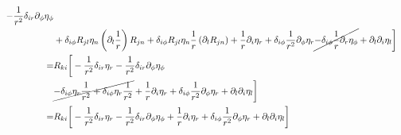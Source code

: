 \documentclass[aps,prl,preprint]{revtex4-2}
\begin{document}
\begin{align}
    -\frac{1}{r^2}\delta_{ir}\partial_\phi\eta_\phi\nonumber                                                                                                                    \\
                                                                 & +\delta_{i\phi}R_{jl}\eta_n\left(\partial_l\frac{1}{r}\right)R_{jn}
    +\delta_{i\phi}R_{jl}\eta_n\frac{1}{r}\left(\partial_lR_{jn}\right) + \frac{1}{r}\partial_i\eta_r
    +\delta_{i\phi}\frac{1}{r^2}\partial_\phi\eta_r\cancel{-\delta_{i\phi}\frac{1}{r}\partial_r\eta_\phi}
    + \partial_l\partial_i\eta_l\bigg]\nonumber                                                                                                                                 \\
    =                                                            & R_{ki}\bigg[-\frac{1}{r^2}\delta_{ir}\eta_r
    -\frac{1}{r^2}\delta_{ir}\partial_\phi\eta_\phi\nonumber                                                                                                                    \\
                                                                 & \cancel{-\delta_{i\phi}\eta_r\frac{1}{r^2} +\delta_{i\phi}\eta_r\frac{1}{r^2}} + \frac{1}{r}\partial_i\eta_r
        +\delta_{i\phi}\frac{1}{r^2}\partial_\phi\eta_r
    + \partial_l\partial_i\eta_l\bigg]\nonumber                                                                                                                                 \\
    =                                                            & R_{ki}\bigg[-\frac{1}{r^2}\delta_{ir}\eta_r
        -\frac{1}{r^2}\delta_{ir}\partial_\phi\eta_\phi + \frac{1}{r}\partial_i\eta_r
        +\delta_{i\phi}\frac{1}{r^2}\partial_\phi\eta_r + \partial_l\partial_i\eta_l\bigg]
\end{align}
\end{document}
